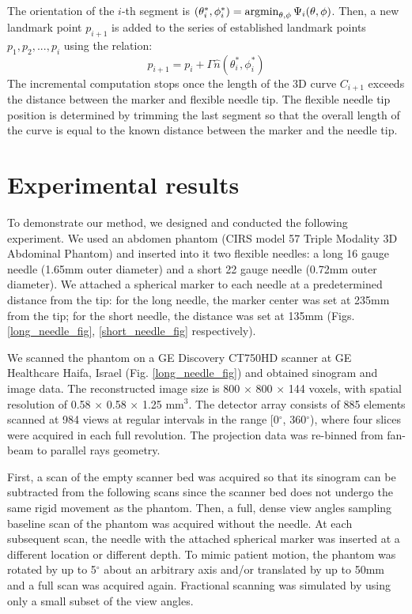 The orientation of the $i$-th segment is $(\theta_i^*, \phi_i^*) = \operatorname*{argmin}_{\theta, \phi} {\Psi_i ( \theta, \phi)}$. Then, a new landmark point $p_{i+1}$ is added to the series of established landmark points $p_1, p_2, ..., p_i$ using the relation:
\begin{equation}
p_{i+1} = p_i + \Gamma \hat{n}(\theta_i^*, \phi_i^*)
\end{equation}
The incremental computation stops once the length of the 3D curve $C_{i+1}$ exceeds the distance between the marker and flexible needle tip. The flexible needle tip position is determined by trimming the last segment so that the overall length of the curve is equal to the known distance between the marker and the needle tip.

\section*{Experimental results}

To demonstrate our method, we designed and conducted the following experiment. We used an abdomen phantom (CIRS model 57 Triple Modality 3D Abdominal Phantom) and inserted into it two flexible needles: a long 16 gauge needle (1.65mm outer diameter) and a short 22 gauge needle (0.72mm outer diameter). We attached a spherical marker to each needle at a predetermined distance from the tip: for the long needle, the marker center was set at 235mm from the tip; for the short needle, the distance was set at 135mm (Figs.  \ref{long_needle_fig}, \ref{short_needle_fig} respectively).

We scanned the phantom on a GE Discovery CT750HD scanner at GE Healthcare Haifa, Israel (Fig. \ref{long_needle_fig}) and obtained sinogram and image data. The reconstructed image size is 800 $\times$ 800 $\times$ 144 voxels, with spatial resolution of 0.58 $\times$ 0.58 $\times$ 1.25 mm$^3$. The detector array consists of 885 elements scanned at 984 views at regular intervals in the range [0$^{\circ}$, 360$^{\circ}$), where four slices were acquired in each full revolution. The projection data was re-binned from fan-beam to parallel rays geometry.

First, a scan of the empty scanner bed was acquired so that its sinogram can be subtracted from the following scans since the scanner bed does not undergo the same rigid movement as the phantom. Then, a full, dense view angles sampling baseline scan of the phantom was acquired without the needle. At each subsequent scan, the needle with the attached spherical marker was inserted at a different location or different depth. To mimic patient motion, the phantom was rotated by up to 5$^\circ$ about an arbitrary axis and/or translated by up to 50mm  and a full scan was acquired again. Fractional scanning was simulated by using only a small subset of the view angles.


